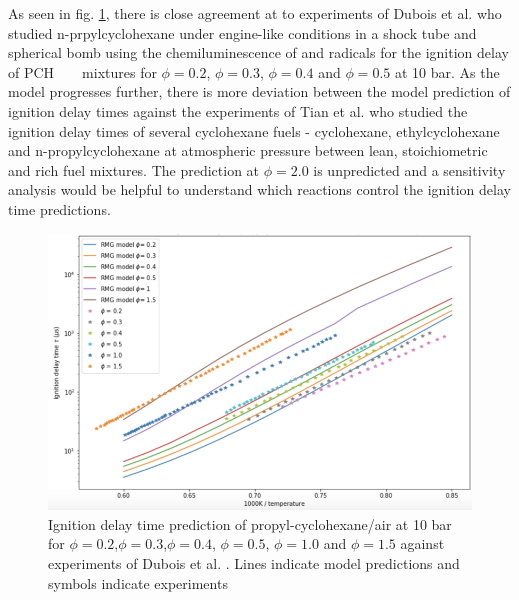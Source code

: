 As seen in fig. \ref{fig:pch-idt-dubois}, there is close agreement at to experiments of Dubois et al.\cite{Dubois2009ExperimentalConditions} who studied n-prpylcyclohexane under engine-like conditions in a shock tube and spherical bomb using the chemiluminescence of  and radicals for the ignition delay of PCH \  \  mixtures for $\phi=0.2$, $\phi=0.3$, $\phi=0.4$ and $\phi=0.5$ at 10 bar. As the model progresses further, there is more deviation between the model prediction of ignition delay times against the experiments of Tian et al. who studied the ignition delay times of several cyclohexane fuels - cyclohexane, ethylcyclohexane and n-propylcyclohexane at atmospheric pressure between lean, stoichiometric and rich fuel mixtures. The prediction at $\phi=2.0$ is unpredicted and a sensitivity analysis would be helpful to understand which reactions control the ignition delay time predictions.


\begin{figure}[!hbp]
    \centering
    \includegraphics[scale=0.4, keepaspectratio]{images/pch-idt-dubois.png}
    \caption{Ignition delay time prediction of propyl-cyclohexane/air at 10 bar for $\phi=0.2$,$\phi=0.3$,$\phi=0.4$, $\phi=0.5$, $\phi=1.0$ and $\phi=1.5$ against experiments of Dubois et al. \cite{Dubois2009ExperimentalConditions}. Lines indicate model predictions and symbols indicate experiments}
    \label{fig:pch-idt-dubois}
\end{figure}



